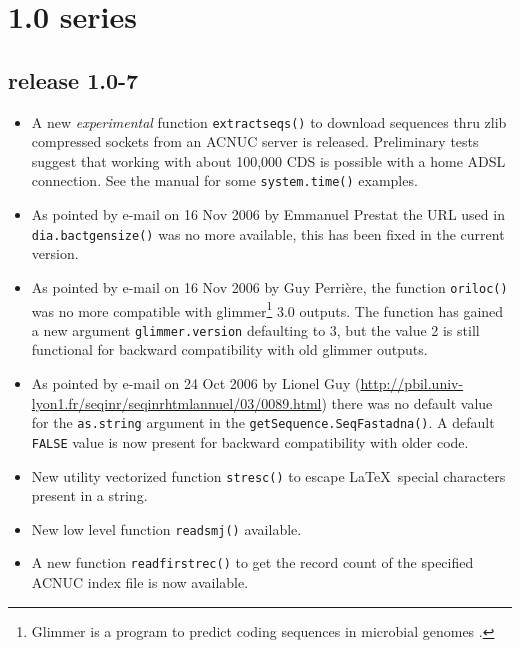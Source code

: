 \documentclass{article}
\begin{document}
\section*{1.0 series}

\subsection*{release 1.0-7}

\begin{itemize}

\item A new \emph{experimental} function \texttt{extractseqs()} to download
sequences thru zlib compressed sockets from an ACNUC server is released. 
Preliminary tests suggest that working with about 100,000 CDS is possible with 
a home ADSL connection. See the manual for some \texttt{system.time()}
examples.

\item As pointed by e-mail on 16 Nov 2006 by Emmanuel Prestat the URL
used in \texttt{dia.bactgensize()} was no more available, this has been fixed
in the current version.

\item As pointed by e-mail on 16 Nov 2006 by Guy Perri{\`e}re, the
function \texttt{oriloc()} was no more compatible with glimmer\footnote{
Glimmer is a program to predict coding sequences in microbial genomes \cite{SalzbergSL1998, DelcherAL1999}.
} 3.0
outputs. The function has gained a new argument \texttt{glimmer.version}
defaulting to 3, but the value 2 is still functional for backward compatibility
with old glimmer outputs.

\item As pointed by e-mail on 24 Oct 2006 by Lionel Guy 
(\url{http://pbil.univ-lyon1.fr/seqinr/seqinrhtmlannuel/03/0089.html})
there was no default value for the \texttt{as.string} argument in
the \texttt{getSequence.SeqFastadna()}. A default \texttt{FALSE}
value is now present for backward compatibility with older code.

\item New utility vectorized function \texttt{stresc()}  to escape \LaTeX~special 
characters present in a string.

\item New low level function \texttt{readsmj()} available.

\item A new function \texttt{readfirstrec()} to get 
the record count of the specified ACNUC index file is now available.


\end{itemize}
\end{document}
